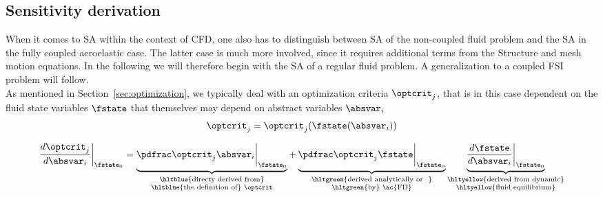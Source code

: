 \documentclass[../main.tex]{subfiles}
\begin{document}
\subsection{Sensitivity derivation}
When it comes to \ac{SA} within the context of \ac{CFD}, one also has to distinguish between \ac{SA} of the non-coupled fluid problem and the \ac{SA} in the fully coupled aeroelastic case. The latter case is much more involved, since it requires additional terms from the Structure and mesh motion equations. In the following we will therefore begin with the \ac{SA} of a regular fluid problem. A generalization to a coupled FSI problem will follow.
 \\


As mentioned in Section~\ref{sec:optimization}, we typically deal with an optimization criteria $\optcrit_j$, that is in this case dependent on the fluid state variables $\fstate$ that themselves may depend on abstract variables $\absvar_i$
\begin{align}
\optcrit_j=\optcrit_j(\fstate(\absvar_i))
\end{align}



\begin{align}\label{eq:sensitivity_startingpoint}
\DoptcritJBYabsvarI\bigg\rvert_{\fstate_0}=
\underbrace{\PoptcritJBYabsvarI\bigg\rvert_{\fstate_0}}_{
                                                        \substack{
                                                                 \text{\hltblue{directy derived from}} \\
                                                                 \text{\hltblue{the definition of} $\optcrit$}
                                                                 } 
                                                        }  +
\underbrace{\PoptcritJBYfstate\bigg\rvert_{\fstate_0}}_ {
                                                        \substack{
                                                                 \text{\hltgreen{derived analytically or~~}}\\
                                                                 \text{\hltgreen{by} \ac{FD}}
                                                                 }
                                                        }
\underbrace{\DfstateBYabsvarI\bigg\rvert_{\fstate_0}}_  {
                                                        \substack{
                                                                 \text{\hltyellow{derived from dynamic}}\\
                                                                 \text{\hltyellow{fluid equilibrium}}
                                                                 }
                                                        }
\end{align}
\end{document}

